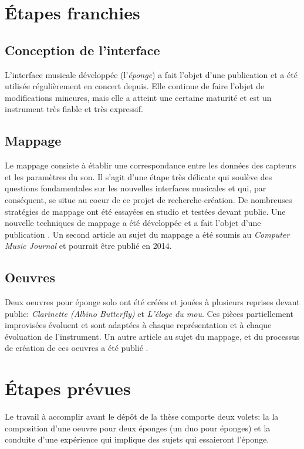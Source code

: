 \documentclass[11pt]{article}
\begin{document}
\section*{Étapes franchies}
\label{sec-2}
\subsection*{Conception de l'interface}
\label{sec-2-1}
L'interface musicale développée (l'\emph{éponge}) a fait l'objet d'une
publication \citep{Marier2010} et a été utilisée régulièrement en concert
depuis.  Elle continue de faire l'objet de modifications mineures, mais
elle a atteint une certaine maturité et est un instrument très fiable et
très expressif.
\subsection*{Mappage}
\label{sec-2-2}
Le mappage consiste à établir une correspondance entre les données des
capteurs et les paramètres du son.  Il s'agit d'une étape très délicate qui
soulève des questions fondamentales sur les nouvelles interfaces musicales
et qui, par conséquent, se situe au coeur de ce projet de
recherche-création.  De nombreuses stratégies de mappage ont été essayées
en studio et testées devant public.  Une nouvelle techniques de mappage a
été développée et a fait l'objet d'une publication \citep{Marier2012a}.  Un
second article au sujet du mappage a été soumis au \emph{Computer Music Journal}
et pourrait être publié en 2014.
\subsection*{Oeuvres}
\label{sec-2-3}
Deux oeuvres pour éponge solo ont été créées et jouées à plusieurs reprises
devant public: \emph{Clarinette (Albino Butterfly)} et \emph{L'éloge du mou}.  Ces
pièces partiellement improvisées évoluent et sont adaptées à chaque
représentation et à chaque évoluation de l'instrument.  Un autre article au
sujet du mappage, et du processus de création de ces oeuvres a été publié
\cite{Marier2012}.

\section*{Étapes prévues}
\label{sec-3}
Le travail à accomplir avant le dépôt de la thèse comporte deux volets: la
la composition d'une oeuvre pour deux éponges (un duo pour éponges) et la
conduite d'une expérience qui implique des sujets qui essaieront l'éponge.




\end{document}

